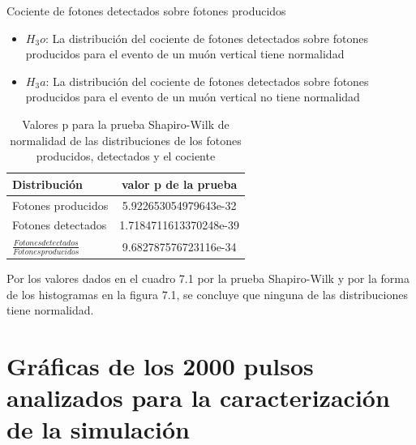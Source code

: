 \documentclass{book}
\begin{document}
Cociente de fotones detectados sobre fotones producidos
\begin{itemize}
\item $H_3o$: La distribuci\'on del cociente de fotones detectados sobre fotones producidos para el evento de un mu\'on vertical tiene normalidad
\item $H_3a$: La distribuci\'on del cociente de fotones detectados sobre fotones producidos para el evento de un mu\'on vertical no tiene normalidad
\end{itemize}

\begin{table}[h]
\caption{ Valores p para la prueba Shapiro-Wilk de normalidad de las distribuciones de los fotones producidos, detectados y el cociente}
\centering
\begin{tabular}{l | c}
\hline
Distribuci\'on & valor p de la prueba \\ \hline
Fotones producidos & 5.922653054979643e-32 \\
Fotones detectados & 1.7184711613370248e-39 \\
$\frac{Fotones detectados}{Fotones producidos}$ & 9.682787576723116e-34 \\

\hline
\end{tabular}
\end{table}

Por los valores dados en el cuadro 7.1 por la prueba Shapiro-Wilk y por la forma de los histogramas en la figura 7.1, se concluye que ninguna de las distribuciones tiene normalidad.

\section{Gr\'aficas de los 2000 pulsos analizados para la caracterizaci\'on de la simulaci\'on}
\end{document}

